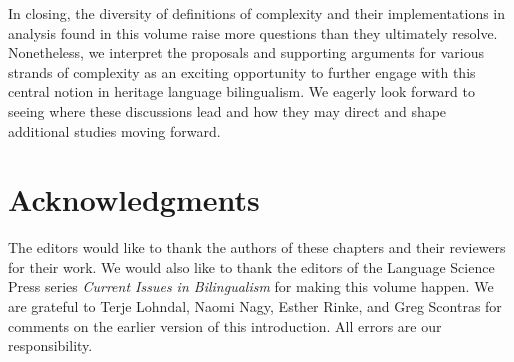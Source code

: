 \documentclass[output=paper,colorlinks,citecolor=brown]{langscibook}
\begin{document}
In closing, the diversity of definitions of complexity and their implementations in analysis found in this volume raise more questions than they ultimately resolve. Nonetheless, we interpret the proposals and supporting arguments for various strands of complexity as an exciting opportunity to further engage with this central notion in heritage language bilingualism. We eagerly look forward to seeing where these discussions lead and how they may direct and shape additional studies moving forward.

\section*{Acknowledgments}

The editors would like to thank the authors of these chapters and their reviewers for their work. We would also like to thank the editors of the Language Science Press series \textit{Current Issues in Bilingualism} for making this volume happen. We are grateful to Terje Lohndal, Naomi Nagy, Esther Rinke, and Greg Scontras for comments on the earlier version of this introduction. All errors are our responsibility.

\printbibliography[heading=subbibliography,notkeyword=this]
\end{document}
